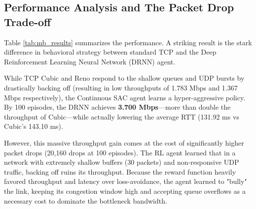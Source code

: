 \documentclass[12pt, a4paper]{article}
\begin{document}
\subsection*{Performance Analysis and The Packet Drop Trade-off}
Table \ref{tab:mb_results} summarizes the performance. A striking result is the stark difference in behavioral strategy between standard TCP and the Deep Reinforcement Learning Neural Network (DRNN) agent. 

While TCP Cubic and Reno respond to the shallow queues and UDP bursts by drastically backing off (resulting in low throughputs of 1.783 Mbps and 1.367 Mbps respectively), the Continuous SAC agent learns a hyper-aggressive policy. By 100 episodes, the DRNN achieves \textbf{3.700 Mbps}—more than double the throughput of Cubic—while actually lowering the average RTT (131.92 ms vs Cubic's 143.10 ms).

However, this massive throughput gain comes at the cost of significantly higher packet drops (20,160 drops at 100 episodes). The RL agent learned that in a network with extremely shallow buffers (30 packets) and non-responsive UDP traffic, backing off ruins its throughput. Because the reward function heavily favored throughput and latency over loss-avoidance, the agent learned to "bully" the link, keeping its congestion window high and accepting queue overflows as a necessary cost to dominate the bottleneck bandwidth.

\begin{table}[H]
\centering
\caption{Multi-Bottleneck Performance: Cubic vs. Reno vs. Continuous SAC DRNN}
\label{tab:mb_results}
\end{table}
\end{document}
